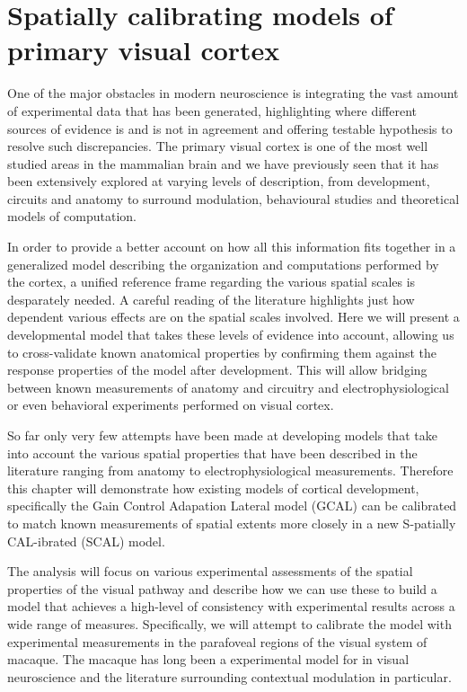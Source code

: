 \chapter{Spatially calibrating models of primary visual cortex}

One of the major obstacles in modern neuroscience is integrating the
vast amount of experimental data that has been generated, highlighting
where different sources of evidence is and is not in agreement and
offering testable hypothesis to resolve such discrepancies. The
primary visual cortex is one of the most well studied areas in the
mammalian brain and we have previously seen that it has been
extensively explored at varying levels of description, from
development, circuits and anatomy to surround modulation, behavioural
studies and theoretical models of computation.

In order to provide a better account on how all this information fits
together in a generalized model describing the organization and
computations performed by the cortex, a unified reference frame
regarding the various spatial scales is desparately needed. A careful
reading of the literature highlights just how dependent various
effects are on the spatial scales involved. Here we will present a
developmental model that takes these levels of evidence into account,
allowing us to cross-validate known anatomical properties by
confirming them against the response properties of the model after
development. This will allow bridging between known measurements of
anatomy and circuitry and electrophysiological or even behavioral
experiments performed on visual cortex.

So far only very few attempts have been made at developing models that
take into account the various spatial properties that have been
described in the literature ranging from anatomy to
electrophysiological measurements.  Therefore this chapter will
demonstrate how existing models of cortical development, specifically
the Gain Control Adapation Lateral model (GCAL) \citep{Stevens2013}
can be calibrated to match known measurements of spatial extents more
closely in a new S-patially CAL-ibrated (SCAL) model.

The analysis will focus on various experimental assessments of the
spatial properties of the visual pathway and describe how we can use
these to build a model that achieves a high-level of consistency with
experimental results across a wide range of measures. Specifically, we
will attempt to calibrate the model with experimental measurements in
the parafoveal regions of the visual system of macaque. The macaque
has long been a experimental model for in visual neuroscience and the
literature surrounding contextual modulation in particular.

